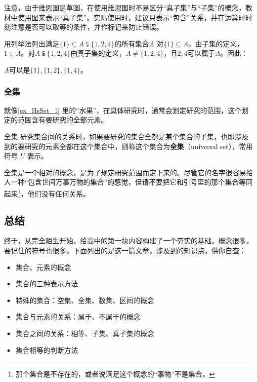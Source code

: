 注意，由于维恩图是草图，在使用维恩图时不易区分“真子集”与“子集”的概念，教材中使用图来表示“真子集”。实际使用时，建议只表示“包含”关系，并在运算时时刻注意是否可以取等的条件，并作标记来防止错误。

\begin{exercise}{用列举法列出满足$\{1\}\subseteq A\subsetneqq\{1,2,4\}$的所有集合$A$}
对$\{1\}\subseteq A$，由子集的定义，$1\in A$。对$A\subsetneqq\{1,2,4\}$由真子集的定义，$A\neq \{1,2,4\}$，且$2,4$可以属于$A$。因此：

$A$可以是$\{1\},\{1,2\},\{1,4\}$。
\end{exercise}
\subsubsection{全集}

就像\autoref{ex_HsSet_1} 里的“水果”，在具体研究时，通常会划定研究的范围，这个划定的范围含有要研究的全部元素。

\begin{definition}{全集}\label{def_HsSet_1}
研究集合间的关系时，如果要研究的集合全都是某个集合的子集，也即涉及到的要研究的元素全都在这个集合中，则称这个集合为\textbf{全集}（universal set），常用符号 $U$ 表示。
\end{definition}


全集是一个相对的概念，是为了规定研究范围而定下来的。尽管它的名字很容易给人一种“包含世间万事万物的集合”的感觉，但请不要把它和引号里的那个集合等同起来\footnote{那个集合是不存在的，或者说满足这个概念的“事物”不是集合。}，他们没有任何关系。


\subsection{总结}

终于，从完全陌生开始，给高中的第一块内容构建了一个夯实的基础。概念很多，要记住的符号也很多，下面列出的是这一篇文章，涉及到的知识点，供你自查：

\begin{itemize}
\item 集合、元素的概念
\item 集合的三种表示方法
\item 特殊的集合：空集、全集、数集、区间的概念
\item 集合与元素的关系：属于、不属于的概念
\item 集合之间的关系：相等、子集、真子集的概念
\item 集合相等的判断方法
\end{itemize}
